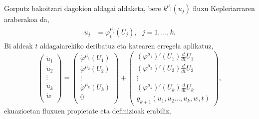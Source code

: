 Gorputz bakoitzari dagokion aldagai aldaketa, bere $k^{\mu_j}(u_j)$ fluxu Kepleriarraren araberakoa da,
\begin{align}
\label{eq:aldfl2}
\begin{split}
u_j&= \varphi_t^{\mu_j}(U_j), \ \ \ j=1,\dots,k.
\end{split}
\end{align}
Bi aldeak $t$ aldagaiarekiko deribatuz eta katearen erregela aplikatuz,
\begin{equation*}
\left(\begin{array}{c}
                \dot{u}_1  \\
                \dot{u}_2  \\
                \vdots \\
                \dot{u}_k    \\
                \dot{w}      \\
\end{array}\right)=
\left(\begin{array}{c}
                \dot{\varphi}^{\mu_1}(U_1)  \\
                \dot{\varphi}^{\mu_2}(U_2)   \\
                \vdots \\
                \dot{\varphi}^{\mu_k}(U_k)   \\
                0      \\
\end{array}\right)+
\left(\begin{array}{c}
      (\varphi^{\mu_1})'(U_1) \frac{d}{dt}U_1 \\
      (\varphi^{\mu_2})'(U_2) \frac{d}{dt}U_2 \\
                \vdots \\
      (\varphi^{\mu_k})'(U_k) \frac{d}{dt}U_k\\
      g_{k+1}(u_1, u_2\dots, u_k,w,t)
\end{array}\right),
\end{equation*}
ekuazioetan fluxuen propietate eta definizioak erabiliz,
